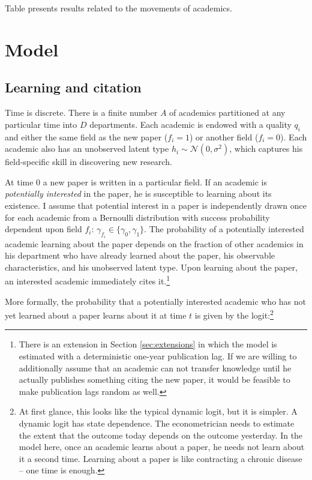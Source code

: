 \documentclass[]{article}
\begin{document}
Table \X presents results related to the movements of academics.

\section{Model}
\label{sec:model}

\subsection{Learning and citation}
\label{sec:learncit}
Time is discrete. There is a finite number $A$ of academics partitioned
at any particular time into $D$ departments. Each academic is endowed with a quality
$q_i$ and either the same field as the new paper ($f_i = 1$) or another
field ($f_i = 0$). Each academic also has an unobserved latent type
$h_i \sim \mathcal{N}(0,\sigma^2)$, which captures his field-specific
skill in discovering new research.

At time $0$ a new paper
is written in a particular field.  If an academic is \emph{potentially interested} in the
paper, he is susceptible to learning about its existence.
I assume that potential interest in a paper is independently drawn once for each
academic from a Bernoulli distribution with success probability dependent upon field $f_i$: 
$\gamma_{f_i} \in \{\gamma_0, \gamma_1\}$.
The probability of a potentially interested academic learning about the paper
depends on the fraction of
other academics in his department who have already learned about the paper,
his observable characteristics, and his unobserved latent type. Upon
learning about the paper, an interested academic immediately cites it.\footnote{There is an extension in Section \ref{sec:extensions} in which the model is estimated with a deterministic one-year publication lag.  If we are willing to additionally assume that an academic can not transfer knowledge until he actually publishes something citing the new paper, it would be feasible to make publication lags random as well.}

More formally, the probability that a potentially interested
academic who has not yet learned
about a paper learns about it at time $t$ is given by the
logit:\footnote{At first glance, this looks like the typical dynamic logit, but it is simpler.  A dynamic logit has state dependence.  The econometrician needs to estimate the extent that the outcome today depends on the outcome yesterday.  In the model here, once an academic learns about a paper, he needs not learn about it a second time.  Learning about a paper is like contracting a chronic disease -- one time is enough.}
\end{document}
